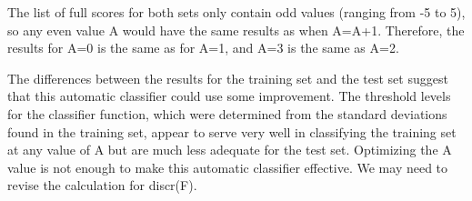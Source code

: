 \documentclass{homework}
\begin{document}
The list of full scores for both sets only contain odd values (ranging from -5 to 5), so any even value A would have the same results as when A=A+1. Therefore, the results for A=0 is the same as for A=1, and A=3 is the same as A=2.

The differences between the results for the training set and the test set suggest that this automatic classifier could use some improvement. The threshold levels for the classifier function, which were determined from the standard deviations found in the training set, appear to serve very well in classifying the training set at any value of A but are much less adequate for the test set. Optimizing the A value is not enough to make this automatic classifier effective. We may need to revise the calculation for discr(F). 

\end{document}
